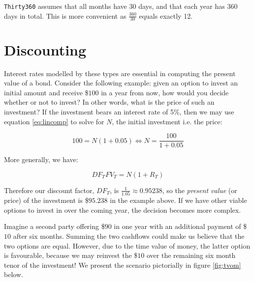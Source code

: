 \texttt{Thirty360} assumes that all months have 30 days, and that each year has
360 days in total. This is more convenient as $\frac{360}{30}$ equals exactly 12.\\

\section{Discounting}\label{sec:discounting}

Interest rates modelled by these types are essential in computing the present
value of a bond. Consider the following example: given an option to invest an
initial amount and receive \$$100$ in a year from now, how would you decide 
whether or not to invest? In other words, what is the price of such an 
investment? If the investment bears an interest rate of 5\%, then we may use
equation \ref{eq:lincomp} to solve for $N$, the initial investment i.e. the price:

\begin{equation}
100 = N (1 + 0.05) \Leftrightarrow N = \frac{100}{1+0.05}
\end{equation}

More generally, we have:

\begin{equation}
DF_T FV_T= N (1 + R_T)
\end{equation}

Therefore our discount factor, $DF_T$, is $\frac{1}{1.05} \approx 0.95238$,
so the \emph{present value} (or price) of the investment is \$$95.238$
in the example above. If we have other viable options to invest in over the coming
year, the decision becomes more complex.

Imagine a second party offering \$$90$ in one year with an additional payment of
\$$10$ after six months. Summing the two cashflows could make us believe that the
two options are equal. However, due to the time value of money, the latter option
is favourable, because we may reinvest the \$$10$ over the remaining six
month tenor of the investment! We present the scenario pictorially in figure
\ref{fig:tvom} below.

